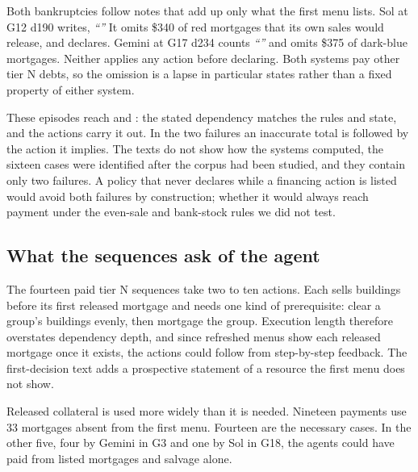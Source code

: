 Both bankruptcies follow notes that add up only what the first menu lists. Sol at G12 d190 writes, \emph{``''} It omits \$340 of red mortgages that its own sales would release, and declares. Gemini at G17 d234 counts \emph{``''} and omits \$375 of dark-blue mortgages. Neither applies any action before declaring. Both systems pay other tier N debts, so the omission is a lapse in particular states rather than a fixed property of either system.

These episodes reach  and : the stated dependency matches the rules and state, and the actions carry it out. In the two failures an inaccurate total is followed by the action it implies. The texts do not show how the systems computed, the sixteen cases were identified after the corpus had been studied, and they contain only two failures. A policy that never declares while a financing action is listed would avoid both failures by construction; whether it would always reach payment under the even-sale and bank-stock rules we did not test.

\subsection{What the sequences ask of the agent}
The fourteen paid tier N sequences take two to ten actions. Each sells buildings before its first released mortgage and needs one kind of prerequisite: clear a group's buildings evenly, then mortgage the group. Execution length therefore overstates dependency depth, and since refreshed menus show each released mortgage once it exists, the actions could follow from step-by-step feedback. The first-decision text adds a prospective statement of a resource the first menu does not show.

Released collateral is used more widely than it is needed. Nineteen payments use 33 mortgages absent from the first menu. Fourteen are the necessary cases. In the other five, four by Gemini in G3 and one by Sol in G18, the agents could have paid from listed mortgages and salvage alone.

